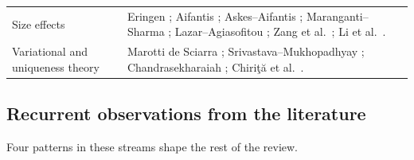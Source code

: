 \begin{table}[t]
\begin{tabularx}{\textwidth}{@{}p{3.2cm}X@{}}
Size effects & Eringen \citep{Eringen1972,Eringen1983}; Aifantis \citep{Aifantis1992}; Askes--Aifantis \citep{Askes2006,Askes2011}; Maranganti--Sharma \citep{Maranganti2006,Maranganti2007}; Lazar--Agiasofitou \citep{Lazar2022}; Zang et al.\ \citep{Zang2014}; Li et al.\ \citep{Li2018}.\\
Variational and uniqueness theory & Marotti de Sciarra \citep{Marotti2013}; Srivastava--Mukhopadhyay \citep{Srivastava2026}; Chandrasekharaiah \citep{Chandrasekharaiah1996}; Chiri\c{t}\u{a} et al.\ \citep{Chirita2016,Tibullo2017}.\\
\bottomrule\end{tabularx}
\end{table}

\subsection{Recurrent observations from the literature}
Four patterns in these streams shape the rest of the review.
